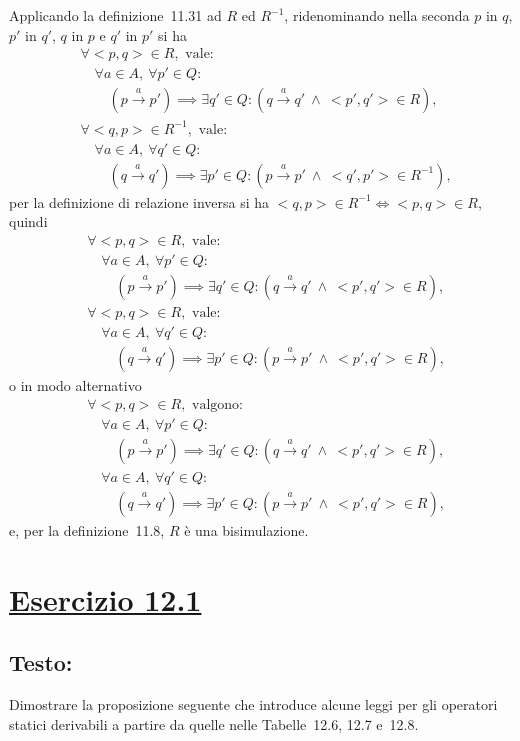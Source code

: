 \documentclass[a4paper,twosides]{report}
\newcommand{\sectionline}{
  \begin{center}
    \resizebox{0.5\linewidth}{5ex}{
      \begin{tikzpicture}
        \node  (C) at (0,0) {};
        \node (D) at (10,0) {};
        \path (C) to [ornament=84] (D);
      \end{tikzpicture}
    }
  \end{center}
}
\begin{document}
Applicando la definizione~11.31 ad $R$ ed $R^{-1}$, ridenominando
nella seconda $p$
in $q$, $p'$ in $q'$, $q$ in $p$ e $q'$ in $p'$ si ha
\begin{align*}
&\forall <p,q>\in R,\text{ vale:}\\
&\quad\forall a\in A,\ \forall p'\in Q:\\
&\quad\quad(p\xrightarrow{a} p')\implies\exists q'\in Q:(q\xrightarrow{a} q'\
\land\ <p',q'>\in R),
\\
&\forall <q,p>\in R^{-1},\text{ vale:}\\
&\quad\forall a\in A,\ \forall q'\in Q:\\
&\quad\quad(q\xrightarrow{a} q')\implies\exists p'\in Q:(p\xrightarrow{a} p'\
\land\ <q',p'>\in R^{-1}),
\end{align*}
per la definizione di relazione inversa si ha
$<q,p>\in R^{-1}\iff<p,q>\in R$, quindi
\begin{align*}
&\forall <p,q>\in R,\text{ vale:}\\
&\quad\forall a\in A,\ \forall p'\in Q:\\
&\quad\quad(p\xrightarrow{a} p')\implies\exists q'\in Q:(q\xrightarrow{a} q'\
\land\ <p',q'>\in R),
\\
&\forall <p,q>\in R,\text{ vale:}\\
&\quad\forall a\in A,\ \forall q'\in Q:\\
&\quad\quad(q\xrightarrow{a} q')\implies\exists p'\in Q:(p\xrightarrow{a} p'\
\land\ <p',q'>\in R),
\end{align*}
o in modo alternativo
\begin{align*}
&\forall <p,q>\in R,\text{ valgono:}\\
&\quad\forall a\in A,\ \forall p'\in Q:\\
&\quad\quad(p\xrightarrow{a} p')\implies\exists q'\in Q:(q\xrightarrow{a} q'\
\land\ <p',q'>\in R),
\\
&\quad\forall a\in A,\ \forall q'\in Q:\\
&\quad\quad(q\xrightarrow{a} q')\implies\exists p'\in Q:(p\xrightarrow{a} p'\
\land\ <p',q'>\in R),
\end{align*}
e, per la definizione~11.8, $R$ \`e una bisimulazione.

\sectionline
\section*{\hyperref[toc]{Esercizio 12.1}}
\subsection*{Testo:}
Dimostrare la proposizione seguente che introduce alcune leggi per gli
operatori statici derivabili 
a partire da quelle nelle Tabelle~12.6, 12.7 e~12.8.
\end{document}
